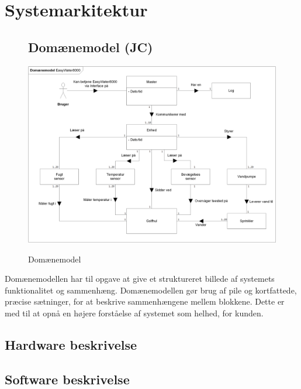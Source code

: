 \chapter{Systemarkitektur}

\begin{figure}[htbp] \centering
\section{Domænemodel (JC)}
{\includegraphics[width=\textwidth]{filer/systemarkitektur/Domainmodel}}
\caption{Domænemodel}
\label{lab:domainmodel}
\end{figure}
Domænemodellen har til opgave at give et struktureret billede af systemets funktionalitet og sammenhæng. Domænemodellen gør brug af pile og kortfattede, præcise sætninger, for at beskrive sammenhængene mellem blokkene. Dette er med til at opnå en højere forståelse af systemet som helhed, for kunden.

\newpage
\section{Hardware beskrivelse}


\section{Software beskrivelse}
